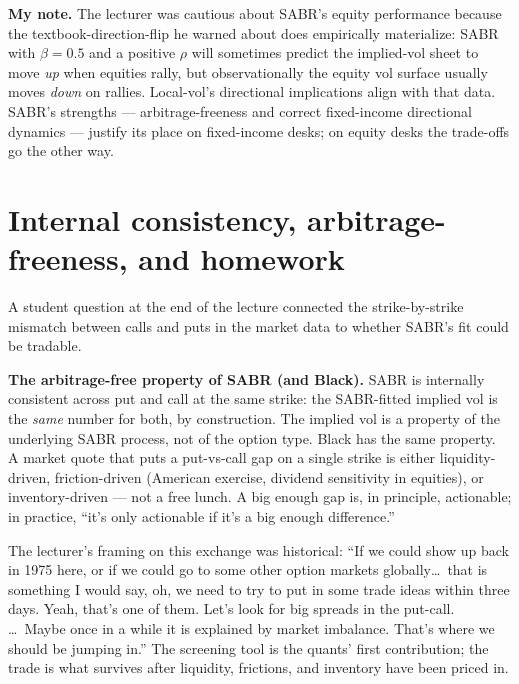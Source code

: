 \begin{checkpoint}
\textbf{My note.} The lecturer was cautious about SABR's equity
performance because the textbook-direction-flip he warned about does
empirically materialize: SABR with $\beta = 0.5$ and a positive $\rho$
will sometimes predict the implied-vol sheet to move \emph{up} when
equities rally, but observationally the equity vol surface usually
moves \emph{down} on rallies. Local-vol's directional implications
align with that data. SABR's strengths --- arbitrage-freeness and
correct fixed-income directional dynamics --- justify its place on
fixed-income desks; on equity desks the trade-offs go the other way.
\end{checkpoint}

\section{Internal consistency, arbitrage-freeness, and
homework}\label{L7-sec:closing}

A student question at the end of the lecture connected the strike-by-strike
mismatch between calls and puts in the market data to whether SABR's
fit could be tradable.

\begin{keyblock}
\textbf{The arbitrage-free property of SABR (and Black).}
SABR is internally consistent across put and call at the same strike:
the SABR-fitted implied vol is the \emph{same} number for both, by
construction. The implied vol is a property of the underlying SABR
process, not of the option type. Black has the same property. \\
A market quote that puts a put-vs-call gap on a single strike is
either liquidity-driven, friction-driven (American exercise, dividend
sensitivity in equities), or inventory-driven --- not a free lunch. A
big enough gap is, in principle, actionable; in practice, ``it's only
actionable if it's a big enough difference.''
\end{keyblock}

The lecturer's framing on this exchange was historical:
``If we could show up back in 1975 here, or if we could go to some
other option markets globally\ldots\ that is something I would say,
oh, we need to try to put in some trade ideas within three days.
Yeah, that's one of them. Let's look for big spreads in the put-call.
\ldots\ Maybe once in a while it is explained by market imbalance.
That's where we should be jumping in.'' The screening tool is the
quants' first contribution; the trade is what survives after
liquidity, frictions, and inventory have been priced in.

